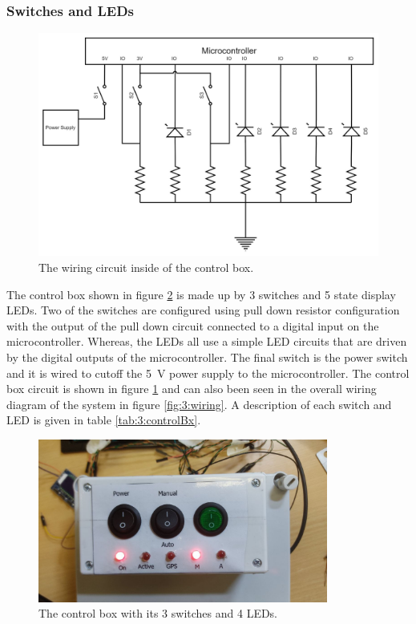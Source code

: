 	\subsubsection{Switches and LEDs}
	\begin{figure}
		\begin{center}
			\includegraphics[width=0.65\linewidth]{figures/BoxCircuit}
			\caption{The wiring circuit inside of the control box.}
			\label{fig:3:controlCircuit}
		\end{center}
	\end{figure}
	The control box shown in figure \ref{fig:3:controlBox} is made up by 3 switches and 5 state display LEDs. Two of the switches are configured using pull down resistor configuration with the output of the pull down circuit connected to a digital input on the microcontroller. Whereas, the LEDs all use a simple LED circuits that are driven by the digital outputs of the microcontroller. The final switch is the power switch and it is wired to cutoff the \SI{5}{\volt} power supply to the microcontroller. The control box circuit is shown in figure \ref{fig:3:controlCircuit} and can also been seen in the overall wiring diagram of the system in figure \ref{fig:3:wiring}. A description of each switch and LED is given in table \ref{tab:3:controlBx}.
	\begin{figure}[hb]
		\begin{center}
			\includegraphics[width = 0.85\textwidth]{figures/controlBox.jpg}
			\caption{The control box with its 3 switches and 4 LEDs.}
			\label{fig:3:controlBox}
		\end{center}
	\end{figure}
